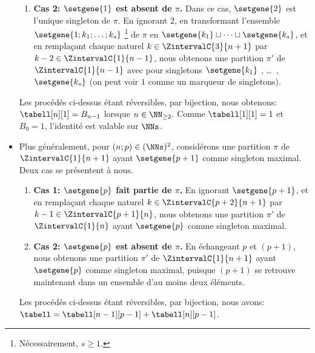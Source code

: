 \begin{itemize}
\begin{enumerate}
    	\item \textbf{\boldmath Cas 2: $\setgene{1}$ est absent de $\pi$.}
        Dans ce cas, $\setgene{2}$ est l'unique singleton de $\pi$.
        En ignorant $2$,
        en transformant l'ensemble $\setgene{1 ; k_1 ; \dots ; k_s}$%
        \footnote{
        	Nécessairement, $s \geq 1$.
        }
        de $\pi$ en $\setgene{k_1} \sqcup \dots \sqcup \setgene{k_s}$,
        et
        en remplaçant chaque naturel $k \in \ZintervalC{3}{n+1}$ par $k-2 \in \ZintervalC{1}{n-1}$,
        nous obtenons une partition $\pi'$ de $\ZintervalC{1}{n-1}$ avec pour singletons $\setgene{k_1}$ , \dots\ , $\setgene{k_s}$
        (on peut voir $1$ comme un marqueur de singletons).
    \end{enumerate}
    Les procédés ci-dessus étant réversibles, par bijection, nous obtenons:
    $\tabell[n][1] = B_{n-1}$ lorsque $n \in \NN_{\geq2}$.
    Comme $\tabell[1][1] = 1$ et $B_0 = 1$, l'identité est valable sur $\NNs$.


    \item Plus généralement, pour $(n ; p) \in (\NNs)^2$, considérons une partition $\pi$ de $\ZintervalC{1}{n+1}$ ayant $\setgene{p+1}$ comme singleton maximal.
    Deux cas se présentent à nous.
    \begin{enumerate}
        \item \textbf{\boldmath Cas 1: $\setgene{p}$ fait partie de $\pi$.}
        En ignorant $\setgene{p+1}$, 
        et
        en remplaçant chaque naturel $k \in \ZintervalC{p+2}{n+1}$ par $k-1 \in \ZintervalC{p+1}{n}$,
        nous obtenons une partition $\pi'$ de $\ZintervalC{1}{n}$ ayant $\setgene{p}$ comme singleton maximal.


        \item \textbf{\boldmath Cas 2: $\setgene{p}$ est absent de $\pi$.}
        En échangeant $p$ et $(p+1)$,
        nous obtenons une partition $\pi'$ de $\ZintervalC{1}{n+1}$ ayant $\setgene{p}$ comme singleton maximal, puisque $(p+1)$ se retrouve maintenant dans un ensemble d'au moins deux éléments. 
    \end{enumerate}
    Les procédés ci-dessus étant réversibles, par bijection, nous avons:
    $\tabell = \tabell[n-1][p-1] +  \tabell[n][p-1]$.
\end{itemize}


